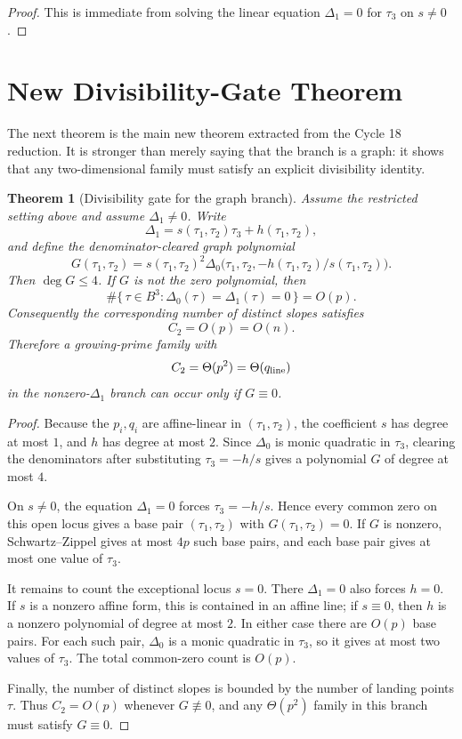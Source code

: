 \documentclass[11pt]{article}
\newtheorem{theorem}{Theorem}
\newcommand{\Deltaone}{\Delta_1}
\newcommand{\Deltazero}{\Delta_0}
\newcommand{\tauone}{\tau_1}
\newcommand{\tautwo}{\tau_2}
\newcommand{\tauthree}{\tau_3}
\newcommand{\Ctwo}{C_2}
\newcommand{\qline}{q_{\rm line}}
\begin{document}
\begin{proof}
This is immediate from solving the linear equation \(\Deltaone=0\) for
\(\tauthree\) on \(s\ne0\).
\end{proof}

\section{New Divisibility-Gate Theorem}

The next theorem is the main new theorem extracted from the Cycle 18
reduction.  It is stronger than merely saying that the branch is a graph: it
shows that any two-dimensional family must satisfy an explicit divisibility
identity.

\begin{theorem}[Divisibility gate for the graph branch]
\label{thm:divisibility-gate}
Assume the restricted setting above and assume \(\Deltaone\ne0\).  Write
\[
  \Deltaone=s(\tauone,\tautwo)\tauthree+h(\tauone,\tautwo),
\]
and define the denominator-cleared graph polynomial
\[
  G(\tauone,\tautwo)
  =s(\tauone,\tautwo)^2
    \Deltazero\bigl(\tauone,\tautwo,-h(\tauone,\tautwo)/s(\tauone,\tautwo)\bigr).
\]
Then \(\deg G\le 4\).  If \(G\) is not the zero polynomial, then
\[
  \#\{\,\tau\in B^3:\Deltazero(\tau)=\Deltaone(\tau)=0\,\}=O(p).
\]
Consequently the corresponding number of distinct slopes satisfies
\[
  \Ctwo=O(p)=O(n).
\]
Therefore a growing-prime family with
\[
  \Ctwo=\Theta(p^2)=\Theta(\qline)
\]
in the nonzero-\(\Deltaone\) branch can occur only if \(G\equiv0\).
\end{theorem}

\begin{proof}
Because the \(p_i,q_i\) are affine-linear in \((\tauone,\tautwo)\), the
coefficient \(s\) has degree at most \(1\), and \(h\) has degree at most \(2\).
Since \(\Deltazero\) is monic quadratic in \(\tauthree\), clearing the
denominators after substituting \(\tauthree=-h/s\) gives a polynomial \(G\) of
degree at most \(4\).

On \(s\ne0\), the equation \(\Deltaone=0\) forces
\(\tauthree=-h/s\).  Hence every common zero on this open locus gives a base
pair \((\tauone,\tautwo)\) with \(G(\tauone,\tautwo)=0\).  If \(G\) is nonzero,
Schwartz--Zippel gives at most \(4p\) such base pairs, and each base pair gives
at most one value of \(\tauthree\).

It remains to count the exceptional locus \(s=0\).  There
\(\Deltaone=0\) also forces \(h=0\).  If \(s\) is a nonzero affine form, this
is contained in an affine line; if \(s\equiv0\), then \(h\) is a nonzero
polynomial of degree at most \(2\).  In either case there are \(O(p)\) base
pairs.  For each such pair, \(\Deltazero\) is a monic quadratic in
\(\tauthree\), so it gives at most two values of \(\tauthree\).  The total
common-zero count is \(O(p)\).

Finally, the number of distinct slopes is bounded by the number of landing
points \(\tau\).  Thus \(\Ctwo=O(p)\) whenever \(G\not\equiv0\), and any
\(\Theta(p^2)\) family in this branch must satisfy \(G\equiv0\).
\end{proof}
\end{document}
